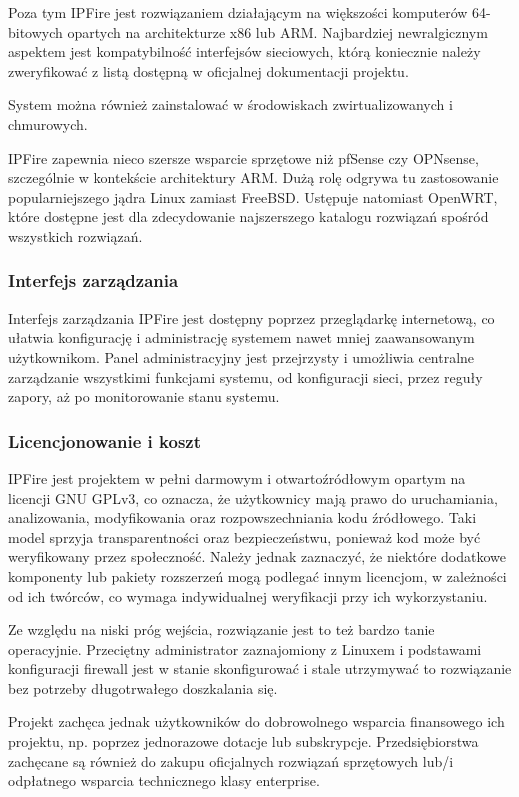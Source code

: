 \documentclass[12pt,a4paper]{article}
\begin{document}
Poza tym IPFire jest rozwiązaniem działającym na większości komputerów 64-bitowych opartych na architekturze x86 lub ARM. Najbardziej newralgicznym aspektem jest kompatybilność interfejsów sieciowych, którą koniecznie należy zweryfikować z listą dostępną w oficjalnej dokumentacji projektu.

System można również zainstalować w środowiskach zwirtualizowanych i chmurowych.

IPFire zapewnia nieco szersze wsparcie sprzętowe niż pfSense czy OPNsense, szczególnie w kontekście architektury ARM. Dużą rolę odgrywa tu zastosowanie popularniejszego jądra Linux zamiast FreeBSD. Ustępuje natomiast OpenWRT, które dostępne jest dla zdecydowanie najszerszego katalogu rozwiązań spośród wszystkich rozwiązań.

\subsubsection{Interfejs zarządzania}
Interfejs zarządzania IPFire jest dostępny poprzez przeglądarkę internetową, co ułatwia konfigurację i administrację systemem nawet mniej zaawansowanym użytkownikom. Panel administracyjny jest przejrzysty i umożliwia centralne zarządzanie wszystkimi funkcjami systemu, od konfiguracji sieci, przez reguły zapory, aż po monitorowanie stanu systemu.

\subsubsection{Licencjonowanie i koszt}
IPFire jest projektem w pełni darmowym i otwartoźródłowym opartym na licencji GNU GPLv3, co oznacza, że użytkownicy mają prawo do uruchamiania, analizowania, modyfikowania oraz rozpowszechniania kodu źródłowego. Taki model sprzyja transparentności oraz bezpieczeństwu, ponieważ kod może być weryfikowany przez społeczność. Należy jednak zaznaczyć, że niektóre dodatkowe komponenty lub pakiety rozszerzeń mogą podlegać innym licencjom, w zależności od ich twórców, co wymaga indywidualnej weryfikacji przy ich wykorzystaniu.

Ze względu na niski próg wejścia, rozwiązanie jest to też bardzo tanie operacyjnie. Przeciętny administrator zaznajomiony z Linuxem i podstawami konfiguracji firewall jest w stanie skonfigurować i stale utrzymywać to rozwiązanie bez potrzeby długotrwałego doszkalania się.

Projekt zachęca jednak użytkowników do dobrowolnego wsparcia finansowego ich projektu, np. poprzez jednorazowe dotacje lub subskrypcje. Przedsiębiorstwa zachęcane są również do zakupu oficjalnych rozwiązań sprzętowych lub/i odpłatnego wsparcia technicznego klasy enterprise.
\end{document}
